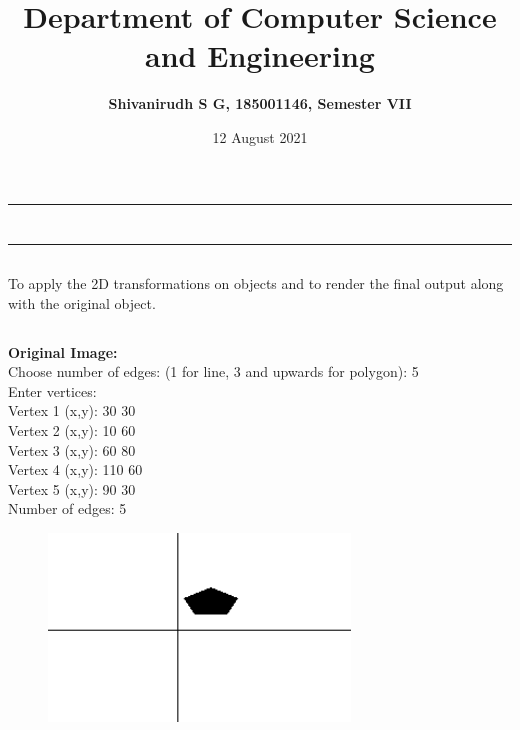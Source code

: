 \documentclass[9pt,letterpaper]{article}
\title{\textbf{Department of Computer Science and Engineering}}
\author{\textbf{Shivanirudh S G, 185001146, Semester VII }}
\date{12 August 2021}
\begin{document}
\maketitle
\hrule
\section*{}
\hrule 
\bigskip\bigskip

\subsection*{}

\subsection*{}
\begin{flushleft}
     To apply the 2D transformations on objects and to render the final output along with the original object.  
\end{flushleft}

\subsection*{}
\begin{flushleft}




\end{flushleft}
\newpage
\subsection*{}
\textbf{Original Image:}\\
Choose number of edges: (1 for line, 3 and upwards for polygon): 5\\
Enter vertices:\\ 
Vertex 1 (x,y): 30 30\\
Vertex 2 (x,y): 10 60\\
Vertex 3 (x,y): 60 80\\
Vertex 4 (x,y): 110 60\\
Vertex 5 (x,y): 90 30\\
Number of edges: 5\\
\begin{figure}[h]
    \centering
    \includegraphics[height=5cm]{Outputs/OP1.png}
\end{figure}
\end{document}
